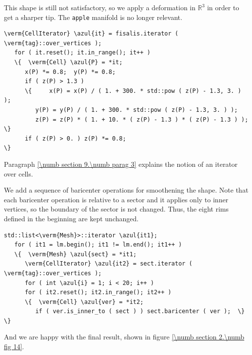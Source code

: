This shape is still not satisfactory, so we apply a deformation in $ \mathbb{R}^3 $ in order to
get a sharper tip.
The {\small\tt apple} manifold is no longer relevant.

\begin{Verbatim}[commandchars=\\\{\},formatcom=\small\tt,frame=single,
   label=parag-\ref{\numb section 2.\numb parag 11}.cpp,rulecolor=\color{coment},
   baselinestretch=0.94,framesep=2mm]
   \verm{CellIterator} \azul{it} = fisalis.iterator ( \verm{tag}::over_vertices );
   for ( it.reset(); it.in_range(); it++ )
   \{  \verm{Cell} \azul{P} = *it;
      x(P) *= 0.8;  y(P) *= 0.8;
      if ( z(P) > 1.3 )
      \{	 x(P) = x(P) / ( 1. + 300. * std::pow ( z(P) - 1.3, 3. ) );
         y(P) = y(P) / ( 1. + 300. * std::pow ( z(P) - 1.3, 3. ) );
         z(P) = z(P) * ( 1. + 10. * ( z(P) - 1.3 ) * ( z(P) - 1.3 ) );  \}
      if ( z(P) > 0. ) z(P) *= 0.8;                                        \}
\end{Verbatim}

Paragraph \ref{\numb section 9.\numb parag 3} explains the notion of an iterator over cells.

We add a sequence of baricenter operations for smoothening the shape.
Note that each baricenter operation is relative to a sector and it applies only to inner
vertices, so the boundary of the sector is not changed.
Thus, the eight rims defined in the beginning are kept unchanged.

\begin{Verbatim}[commandchars=\\\{\},formatcom=\small\tt,frame=single,
   label=parag-\ref{\numb section 2.\numb parag 11}.cpp,rulecolor=\color{coment},
   baselinestretch=0.94,framesep=2mm]
   std::list<\verm{Mesh}>::iterator \azul{it1};
   for ( it1 = lm.begin(); it1 != lm.end(); it1++ )
   \{  \verm{Mesh} \azul{sect} = *it1;
      \verm{CellIterator} \azul{it2} = sect.iterator ( \verm{tag}::over_vertices );
      for ( int \azul{i} = 1; i < 20; i++ )
      for ( it2.reset(); it2.in_range(); it2++ )
      \{  \verm{Cell} \azul{ver} = *it2;
         if ( ver.is_inner_to ( sect ) ) sect.baricenter ( ver );  \}                     \}
\end{Verbatim}

And we are happy with the final result, shown in figure \ref{\numb section 2.\numb fig 14}.

